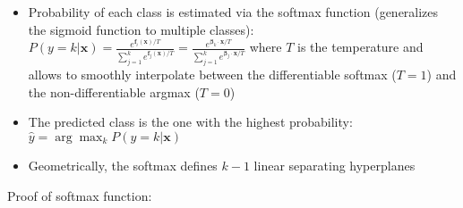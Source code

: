 \begin{itemize}
    \item Probability of each class is estimated via the softmax function (generalizes the sigmoid function to multiple classes):
    $
    P(y=k|\boldsymbol{x}) = \frac{e^{\boldsymbol{f}_i(\boldsymbol{x}) / T}}{\sum_{j=1}^k e^{\boldsymbol{f}_j(\boldsymbol{x}) / T}} = \frac{e^{\boldsymbol{\beta}_k \cdot \boldsymbol{x} / T}}{\sum_{j=1}^k e^{\boldsymbol{\beta}_j \cdot \boldsymbol{x} / T}}
    $ where $T$ is the temperature and allows to smoothly interpolate between the differentiable softmax ($T=1$) and the non-differentiable argmax ($T=0$)
    \item The predicted class is the one with the highest probability:
    $
    \hat{y} = \arg \max_k P(y=k|\boldsymbol{x})
    $
    \item Geometrically, the softmax defines $k-1$ linear separating hyperplanes
\end{itemize}
Proof of softmax function:
